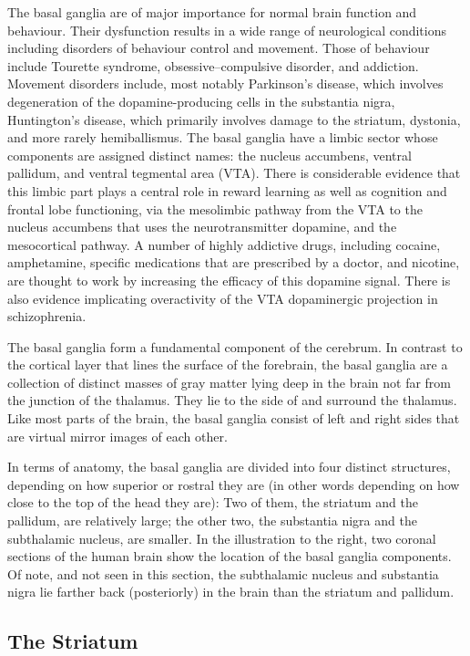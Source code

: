 \documentclass[]{book}
\begin{document}
The basal ganglia are of major importance for normal brain function and behaviour. Their dysfunction results in a wide range of neurological conditions including disorders of behaviour control and movement. Those of behaviour include Tourette syndrome, obsessive--compulsive disorder, and addiction. Movement disorders include, most notably Parkinson's disease, which involves degeneration of the dopamine-producing cells in the substantia nigra, Huntington's disease, which primarily involves damage to the striatum, dystonia, and more rarely hemiballismus. The basal ganglia have a limbic sector whose components are assigned distinct names: the nucleus accumbens, ventral pallidum, and ventral tegmental area (VTA). There is considerable evidence that this limbic part plays a central role in reward learning as well as cognition and frontal lobe functioning, via the mesolimbic pathway from the VTA to the nucleus accumbens that uses the neurotransmitter dopamine, and the mesocortical pathway. A number of highly addictive drugs, including cocaine, amphetamine, specific medications that are prescribed by a doctor, and nicotine, are thought to work by increasing the efficacy of this dopamine signal. There is also evidence implicating overactivity of the VTA dopaminergic projection in schizophrenia.

The basal ganglia form a fundamental component of the cerebrum. In contrast to the cortical layer that lines the surface of the forebrain, the basal ganglia are a collection of distinct masses of gray matter lying deep in the brain not far from the junction of the thalamus. They lie to the side of and surround the thalamus. Like most parts of the brain, the basal ganglia consist of left and right sides that are virtual mirror images of each other.

In terms of anatomy, the basal ganglia are divided into four distinct structures, depending on how superior or rostral they are (in other words depending on how close to the top of the head they are): Two of them, the striatum and the pallidum, are relatively large; the other two, the substantia nigra and the subthalamic nucleus, are smaller. In the illustration to the right, two coronal sections of the human brain show the location of the basal ganglia components. Of note, and not seen in this section, the subthalamic nucleus and substantia nigra lie farther back (posteriorly) in the brain than the striatum and pallidum.

\hypertarget{the-striatum}{%
\subsection{The Striatum}\label{the-striatum}}
\end{document}
